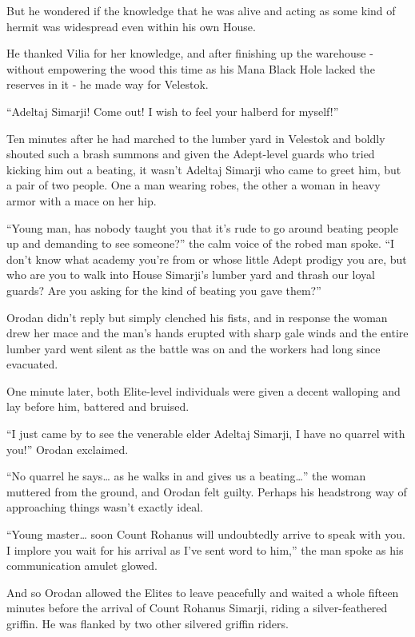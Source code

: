 \documentclass[a4paper,10pt]{book}
\begin{document}
But he wondered if the knowledge that he was alive and acting as some kind of hermit was widespread even within his own House.\par
He thanked Vilia for her knowledge, and after finishing up the warehouse - without empowering the wood this time as his Mana Black Hole lacked the reserves in it - he made way for Velestok.\par
\par
“Adeltaj Simarji! Come out! I wish to feel your halberd for myself!”\par
Ten minutes after he had marched to the lumber yard in Velestok and boldly shouted such a brash summons and given the Adept-level guards who tried kicking him out a beating, it wasn’t Adeltaj Simarji who came to greet him, but a pair of two people. One a man wearing robes, the other a woman in heavy armor with a mace on her hip.\par
“Young man, has nobody taught you that it’s rude to go around beating people up and demanding to see someone?” the calm voice of the robed man spoke. “I don’t know what academy you’re from or whose little Adept prodigy you are, but who are you to walk into House Simarji’s lumber yard and thrash our loyal guards? Are you asking for the kind of beating you gave them?”\par
Orodan didn’t reply but simply clenched his fists, and in response the woman drew her mace and the man’s hands erupted with sharp gale winds and the entire lumber yard went silent as the battle was on and the workers had long since evacuated.\par
One minute later, both Elite-level individuals were given a decent walloping and lay before him, battered and bruised.\par
“I just came by to see the venerable elder Adeltaj Simarji, I have no quarrel with you!” Orodan exclaimed.\par
“No quarrel he says… as he walks in and gives us a beating…” the woman muttered from the ground, and Orodan felt guilty. Perhaps his headstrong way of approaching things wasn’t exactly ideal.\par
“Young master… soon Count Rohanus will undoubtedly arrive to speak with you. I implore you wait for his arrival as I’ve sent word to him,” the man spoke as his communication amulet glowed.\par
And so Orodan allowed the Elites to leave peacefully and waited a whole fifteen minutes before the arrival of Count Rohanus Simarji, riding a silver-feathered griffin. He was flanked by two other silvered griffin riders.\par
\end{document}
